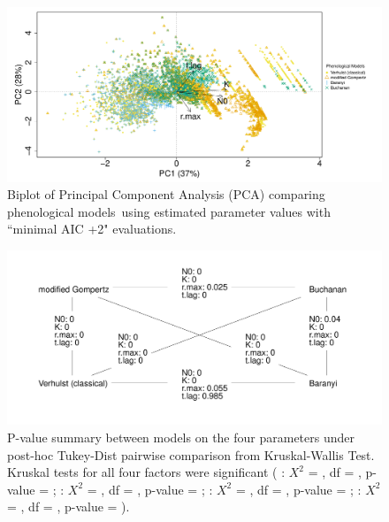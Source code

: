 \documentclass[a4paper, 11pt]{article}
\newcommand{\pms}{phenological models}
\begin{document}
	 \begin{figure}[H]
	 	\centering
	 	\includegraphics[width=\linewidth]{../results/Log_PCA.pdf}
	 	\caption{Biplot of Principal Component Analysis (PCA) comparing \pms\ using estimated parameter values with ``minimal AIC +2"\autocite{burnham2004multimodel} evaluations.}\label{biptPCA}
	 \end{figure}
 \begin{figure}[H]
 	\centering
 	\includegraphics[width=\linewidth]{../results/Log_PCA_kt.pdf}
 	\caption{P-value summary between models on the four parameters under post-hoc Tukey-Dist pairwise comparison from Kruskal-Wallis Test.  Kruskal tests for all four factors were significant (
 		: $X^{2}$ =
 		, df = 
 		, p-value = 
 		; 
 		: $X^{2}$ =
 		, df = 
 		, p-value = 
 		; 
 		: $X^{2}$ =
 		, df = 
 		, p-value = 
 		; 
 		: $X^{2}$ =
 		, df = 
 		, p-value = 
 		).}\label{pValDraw}
 \end{figure}
\end{document}
